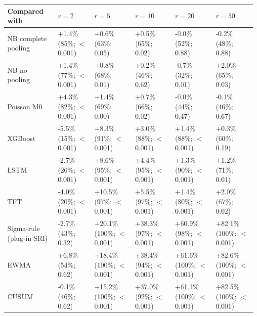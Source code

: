 \begin{landscape}
\noindent\begin{minipage}{\linewidth}
\label{tab:S20}
\centering\scriptsize
\begin{tabular}{llllll}
\toprule
Compared with & $r = 2$ & $r = 5$ & $r = 10$ & $r = 20$ & $r = 50$ \\ \midrule
NB complete pooling & +1.4\% (85\%; $<$0.001) & +0.6\% (63\%; 0.05) & +0.5\% (65\%; 0.02) & -0.0\% (52\%; 0.88) & -0.2\% (48\%; 0.88) \\
NB no pooling & +1.4\% (77\%; $<$0.001) & +0.8\% (68\%; 0.01) & +0.2\% (46\%; 0.62) & -0.7\% (32\%; 0.01) & +2.0\% (65\%; 0.03) \\
Poisson M0 & +4.3\% (82\%; $<$0.001) & +1.4\% (69\%; 0.00) & +0.7\% (66\%; 0.02) & -0.0\% (44\%; 0.47) & -0.1\% (46\%; 0.67) \\
XGBoost & -5.5\% (15\%; $<$0.001) & +8.3\% (91\%; $<$0.001) & +3.0\% (88\%; $<$0.001) & +1.4\% (88\%; $<$0.001) & +0.3\% (60\%; 0.19) \\
LSTM & -2.7\% (26\%; $<$0.001) & +8.6\% (95\%; $<$0.001) & +4.4\% (95\%; $<$0.001) & +1.3\% (90\%; $<$0.001) & +1.2\% (71\%; 0.01) \\
TFT & -4.0\% (20\%; $<$0.001) & +10.5\% (97\%; $<$0.001) & +5.5\% (97\%; $<$0.001) & +1.4\% (80\%; $<$0.001) & +2.0\% (67\%; 0.02) \\
Sigma-rule (plug-in SRI) & -2.7\% (43\%; 0.32) & +20.1\% (100\%; $<$0.001) & +38.3\% (97\%; $<$0.001) & +60.9\% (98\%; $<$0.001) & +82.1\% (100\%; $<$0.001) \\
EWMA & +6.8\% (54\%; 0.62) & +18.4\% (100\%; $<$0.001) & +38.4\% (94\%; $<$0.001) & +61.6\% (100\%; $<$0.001) & +82.6\% (100\%; $<$0.001) \\
CUSUM & -0.1\% (46\%; 0.62) & +15.2\% (100\%; $<$0.001) & +37.0\% (92\%; $<$0.001) & +61.1\% (100\%; $<$0.001) & +82.5\% (100\%; $<$0.001) \\

\end{tabular}
\end{minipage}
\end{landscape}
